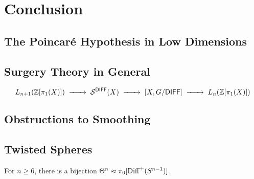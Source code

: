 \chapter{Conclusion}

\section{The Poincar\'e Hypothesis in Low Dimensions}

\section{Surgery Theory in General}

\begin{theorem}[$s$-cobordism]
\end{theorem}

\[
	L_{n+1}(\Z[\pi_1(X)]) \lkxto \mathcal{S}^\DIFF(X) \lkxto {[X, G/\DIFF]} \lkxto L_n(\Z[\pi_1(X)])
\]

\section{Obstructions to Smoothing}

\section{Twisted Spheres}\label{sec:twisted-spheres}

\begin{theorem}
  For $n\geq 6$, there is a bijection $\Theta^n \approx \pi_0[\operatorname{Diff}^+(S^{n-1})]$.
\end{theorem}

\cite{witten1985anomalies}
